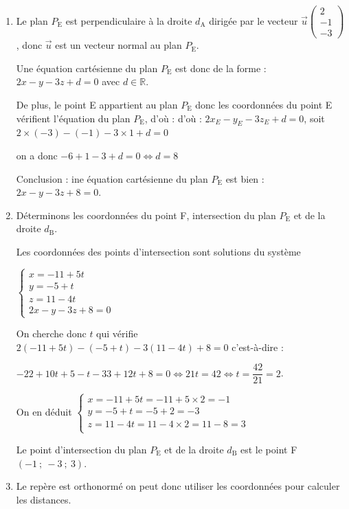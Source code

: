 \documentclass[10pt]{article}
\providecommand{\R}{\mathbb{R}}
\providecommand{\vect}[1]{\overrightarrow{#1}}
\begin{document}
\begin{enumerate}
\begin{enumerate}
Le point E$(-3~;~-1~;~1)$  correspond au point de paramètre $s = 2$ donc l'avion Alpha passe par le point~E.
		\item Le plan  $P_{\mathrm{E}}$ est perpendiculaire à la droite  $d_{\mathrm{A}}$ dirigée par le vecteur $\vect{u}\begin{pmatrix}2\\- 1\\- 3\end{pmatrix}$, donc $\vect{u}$ est un vecteur normal au plan $P_{\mathrm{E}}$.

Une équation cartésienne du plan $P_{\mathrm{E}}$ est donc de la forme : $2x - y - 3z + d = 0$ avec $d\in \R$.

De plus, le point E appartient au plan  $P_{\mathrm{E}}$ donc les coordonnées du point E vérifient l'équation du plan $P_{\mathrm{E}}$,
		d'où : d'où : $2x_E - y_E - 3z_E + d = 0$, soit $2 \times (-3) - (-1) - 3 \times 1 + d = 0$

on a donc $-6+1-3+d=0 \iff d = 8$

Conclusion : ine équation cartésienne du plan  $P_{\mathrm{E}}$ est bien : $2x - y - 3z + 8 = 0.$
		\item Déterminons les coordonnées du point F,  intersection du plan $P_{\mathrm{E}}$ et de la droite $d_{\mathrm{B}}$.

Les coordonnées des points d'intersection sont solutions du système

$\begin{cases}
x=-11+5t\\ y=-5+t \\ z=11-4t \\ 2x-y-3z+8 = 0
\end{cases}$

On cherche donc $t$ qui vérifie $2(-11 + 5t)- (-5 + t)-3(11 - 4t) + 8 = 0$ c'est-à-dire : 

$-22+10t +5-t -33 +12t+8=0 \iff 21t= 42 \iff t=\dfrac{42}{21} = 2$.

\smallskip

On en déduit
$\begin{cases}
x=-11+5t=-11+5\times 2 =-1\\
y= -5+t=-5+2=-3\\
z=11-4t=11-4\times 2 =11-8=3\\
\end{cases}$

Le point d'intersection du plan  $P_{\mathrm{E}}$ et de la droite $d_{\mathrm{B}}$ est le point  F$(-1~;~-3~;~3)$.
		\item Le repère est orthonormé on peut donc utiliser les coordonnées pour calculer les distances.


\end{enumerate}
\end{enumerate}
\end{document}
